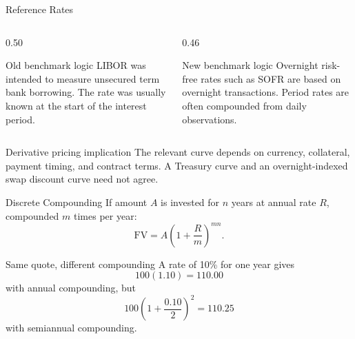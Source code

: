 \documentclass[aspectratio=169,11pt]{beamer}
\newcommand{\FV}{\mathrm{FV}}
\begin{document}
\begin{frame}{Reference Rates}
    \begin{columns}[T]
        \begin{column}{0.50\textwidth}
            \begin{block}{Old benchmark logic}
                LIBOR was intended to measure unsecured term bank borrowing.
                The rate was usually known at the start of the interest period.
            \end{block}
        \end{column}
        \begin{column}{0.46\textwidth}
            \begin{block}{New benchmark logic}
                Overnight risk-free rates such as SOFR are based on overnight transactions.
                Period rates are often compounded from daily observations.
            \end{block}
        \end{column}
    \end{columns}

    \vspace{0.6em}
    \begin{alertblock}{Derivative pricing implication}
        The relevant curve depends on currency, collateral, payment timing, and contract terms.
        A Treasury curve and an overnight-indexed swap discount curve need not agree.
    \end{alertblock}
\end{frame}

\begin{frame}{Discrete Compounding}
    If amount \(A\) is invested for \(n\) years at annual rate \(R\), compounded \(m\) times per year:
    \[
        \FV=A\left(1+\frac{R}{m}\right)^{mn}.
    \]

    \begin{exampleblock}{Same quote, different compounding}
        A rate of 10\% for one year gives
        \[
            100(1.10)=110.00
        \]
        with annual compounding, but
        \[
            100\left(1+\frac{0.10}{2}\right)^2=110.25
        \]
        with semiannual compounding.
    \end{exampleblock}
\end{frame}
\end{document}

